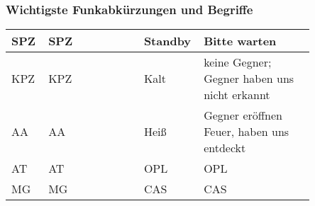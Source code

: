 \subsubsection{Wichtigste Funkabkürzungen und Begriffe}
	\begin{longtable}{p{0.1\linewidth}p{0.25\linewidth}p{0.05\linewidth}p{0.1\linewidth}p{0.35\linewidth}} 
		\toprule
		\acs{SPZ}	& \acl{SPZ}	&& Standby	& Bitte warten \hfil\\ 
		\midrule
		\acs{KPZ}	& \acl{KPZ}	&& Kalt		& keine Gegner; Gegner haben uns nicht erkannt\\ 
		\acs{AA}	& \acl{AA}	&& Heiß 		& Gegner eröffnen Feuer, haben uns entdeckt \\ 
		\acs{AT}	& \acl{AT}	&& \acs{OPL}	& \acl{OPL} \\ 
		\acs{MG}	& \acl{MG}	&& \acs{CAS}	& \acl{CAS} \\ 
		\bottomrule
	\end{longtable}


